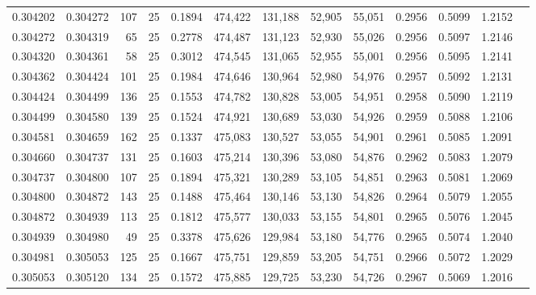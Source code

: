 \begin{tabular}{rrrrrrrrrrrrr}
0.304202 & 0.304272 &   107 &  25 &                                     0.1894 & 474,422 & 131,188 &  52,905 &  55,051 & 0.2956 & 0.5099 & 1.2152 \\
0.304272 & 0.304319 &    65 &  25 &                                     0.2778 & 474,487 & 131,123 &  52,930 &  55,026 & 0.2956 & 0.5097 & 1.2146 \\
0.304320 & 0.304361 &    58 &  25 &                                     0.3012 & 474,545 & 131,065 &  52,955 &  55,001 & 0.2956 & 0.5095 & 1.2141 \\
0.304362 & 0.304424 &   101 &  25 &                                     0.1984 & 474,646 & 130,964 &  52,980 &  54,976 & 0.2957 & 0.5092 & 1.2131 \\
0.304424 & 0.304499 &   136 &  25 &                                     0.1553 & 474,782 & 130,828 &  53,005 &  54,951 & 0.2958 & 0.5090 & 1.2119 \\
0.304499 & 0.304580 &   139 &  25 &                                     0.1524 & 474,921 & 130,689 &  53,030 &  54,926 & 0.2959 & 0.5088 & 1.2106 \\
0.304581 & 0.304659 &   162 &  25 &                                     0.1337 & 475,083 & 130,527 &  53,055 &  54,901 & 0.2961 & 0.5085 & 1.2091 \\
0.304660 & 0.304737 &   131 &  25 &                                     0.1603 & 475,214 & 130,396 &  53,080 &  54,876 & 0.2962 & 0.5083 & 1.2079 \\
0.304737 & 0.304800 &   107 &  25 &                                     0.1894 & 475,321 & 130,289 &  53,105 &  54,851 & 0.2963 & 0.5081 & 1.2069 \\
0.304800 & 0.304872 &   143 &  25 &                                     0.1488 & 475,464 & 130,146 &  53,130 &  54,826 & 0.2964 & 0.5079 & 1.2055 \\
0.304872 & 0.304939 &   113 &  25 &                                     0.1812 & 475,577 & 130,033 &  53,155 &  54,801 & 0.2965 & 0.5076 & 1.2045 \\
0.304939 & 0.304980 &    49 &  25 &                                     0.3378 & 475,626 & 129,984 &  53,180 &  54,776 & 0.2965 & 0.5074 & 1.2040 \\
0.304981 & 0.305053 &   125 &  25 &                                     0.1667 & 475,751 & 129,859 &  53,205 &  54,751 & 0.2966 & 0.5072 & 1.2029 \\
0.305053 & 0.305120 &   134 &  25 &                                     0.1572 & 475,885 & 129,725 &  53,230 &  54,726 & 0.2967 & 0.5069 & 1.2016 \\

\end{tabular}
